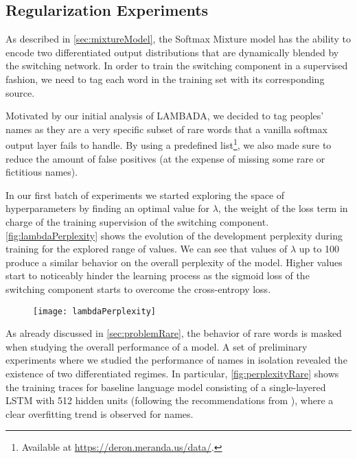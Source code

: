 \subsection{Regularization Experiments}
\label{sec:regExps}

As described in \autoref{sec:mixtureModel}, the Softmax Mixture model has the ability to encode two differentiated output distributions that are dynamically blended by the switching network. In order to train the switching component in a supervised fashion, we need to tag each word in the training set with its corresponding source. 

Motivated by our initial analysis of LAMBADA, we decided to tag peoples' names as they are a very specific subset of rare words that a vanilla softmax output layer fails to handle. By using a predefined list\footnote{Available at \url{https://deron.meranda.us/data/}.}, we also made sure to reduce the amount of false positives (at the expense of missing some rare or fictitious names).

In our first batch of experiments we started exploring the space of hyperparameters by finding an optimal value for $\lambda$, the weight of the loss term in charge of the training supervision of the switching component. \autoref{fig:lambdaPerplexity} shows the evolution of the development perplexity during training for the explored range of values. We can see that values of $\lambda$ up to 100 produce a similar behavior on the overall perplexity of the model. Higher values start to noticeably hinder the learning process as the sigmoid loss of the switching component starts to overcome the cross-entropy loss.

\begin{figure}[H]
	\centering
	\texttt{[image: lambdaPerplexity]}
	\label{fig:lambdaPerplexity}
\end{figure}

As already discussed in \autoref{sec:problemRare}, the behavior of rare words is masked when studying the overall performance of a model. A set of preliminary experiments where we studied the performance of names in isolation revealed the existence of two differentiated regimes. In particular, \autoref{fig:perplexityRare} shows the training traces for baseline language model consisting of a single-layered LSTM with 512 hidden units (following the recommendations from \cite{paperno2016lambada}), where a clear overfitting trend is observed for names.

